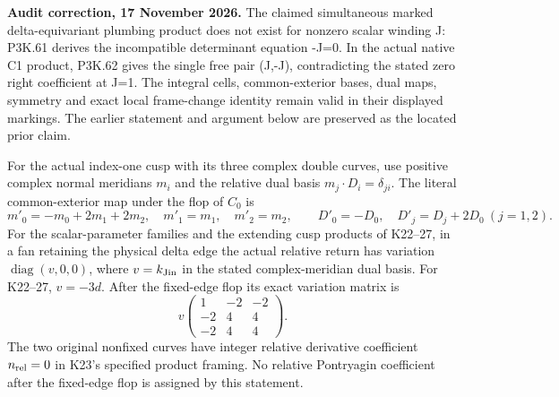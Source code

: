 \begin{theorem}\label{night:P3K.29}
\par\noindent\textbf{Audit correction, 17 November 2026.} The claimed simultaneous marked delta-equivariant plumbing product does not exist for nonzero scalar winding J: P3K.61 derives the incompatible determinant equation -J=0. In the actual native C1 product, P3K.62 gives the single free pair (J,-J), contradicting the stated zero right coefficient at J=1. The integral cells, common-exterior bases, dual maps, symmetry and exact local frame-change identity remain valid in their displayed markings. The earlier statement and argument below are preserved as the located prior claim.
\medskip

For the actual index-one cusp with its three complex double curves,
use positive complex normal meridians \(m_i\) and the relative dual
basis \(m_j\cdot D_i=\delta_{ji}\). The literal common-exterior map
under the flop of \(C_0\) is
\[
 m'_0=-m_0+2m_1+2m_2,\quad m'_1=m_1,\quad m'_2=m_2,
 \qquad D'_0=-D_0,\quad D'_j=D_j+2D_0\ (j=1,2).
\]
For the scalar-parameter families and the extending cusp products
of K22--27, in a fan retaining the physical delta edge the actual
relative return has variation \(\operatorname{diag}(v,0,0)\), where
\(v=k_{\rm Jin}\) in the stated complex-meridian dual basis.
For K22--27, \(v=-3d\). After the fixed-edge flop its exact
variation matrix is
\[
 v\begin{pmatrix}1&-2&-2\\-2&4&4\\-2&4&4\end{pmatrix}.
\]
The two original nonfixed curves have integer relative derivative
coefficient \(n_{\rm rel}=0\) in K23's specified product framing.
No relative Pontryagin coefficient after the fixed-edge flop is
assigned by this statement.
\end{theorem}
